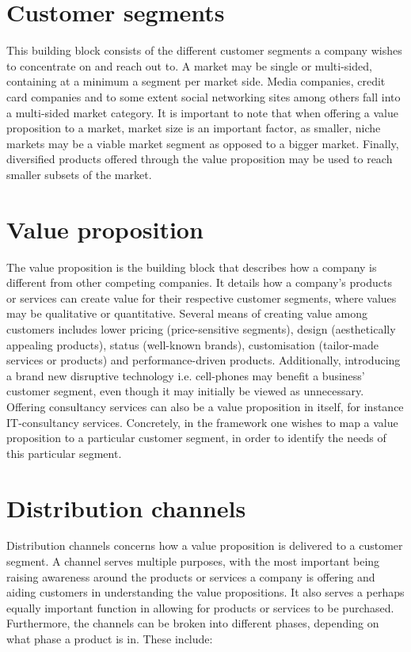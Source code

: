 \section{Customer segments}
This building block consists of the different customer segments a company wishes to concentrate on and reach out to. A market may be single or multi-sided, containing at a minimum a segment per market side. Media companies, credit card companies and to some extent social networking sites among others fall into a multi-sided market category. It is important to note that when offering a value proposition to a market, market size is an important factor, as smaller, niche markets may be a viable market segment as opposed to a bigger market. Finally, diversified products offered through the value proposition may be used to reach smaller subsets of the market.

\section{Value proposition}
The value proposition is the building block that describes how a company is different from other competing companies. It details how a company's products or services can create value for their respective customer segments, where values may be qualitative or quantitative. Several means of creating value among customers  includes lower pricing (price-sensitive segments), design (aesthetically appealing products), status (well-known brands), customisation (tailor-made services or products) and performance-driven products. Additionally, introducing a brand new disruptive technology i.e. cell-phones may benefit a business' customer segment, even though it may initially be viewed as unnecessary. Offering consultancy services can also be a value proposition in itself, for instance IT-consultancy services. Concretely, in the framework one wishes to map a value proposition to a particular customer segment, in order to identify the needs of this particular segment.

\section{Distribution channels}
Distribution channels concerns how a value proposition is delivered to a customer segment. A channel serves multiple purposes, with the most important being raising awareness around the products or services a company is offering and aiding customers in understanding the value propositions. It also serves a perhaps equally important function in allowing for products or services to be purchased. Furthermore, the channels can be broken into different phases, depending on what phase a product is in. These include:

